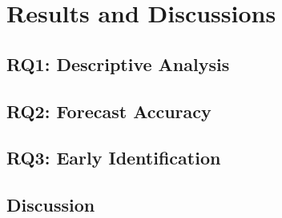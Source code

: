 \chapter{Results and Discussions} \label{chap:res}

\section{RQ1: Descriptive Analysis}

\section{RQ2: Forecast Accuracy}

\section{RQ3: Early Identification}

\section{Discussion}
